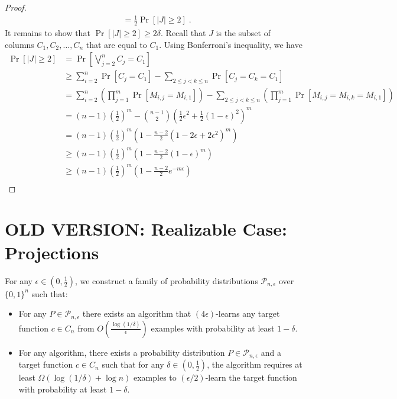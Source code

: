 \documentclass[12pt]{article}
\renewcommand{\P}{\mathcal{P}}
\begin{document}
\begin{proof}
\begin{align*}
& = \frac{1}{2} \Pr \left[ |J| \ge 2 \right] \; .
\end{align*}
It remains to show that $\Pr \left[ |J| \ge 2 \right] \ge 2 \delta$.
Recall that $J$ is the subset of columns $C_1, C_2, \dots, C_n$ that are equal to $C_1$.
Using Bonferroni's inequality, we have
\begin{align*}
\Pr\left[ |J| \ge 2 \right]
& = \Pr\left[ \bigvee_{j=2}^n C_j = C_1 \right] \\
& \ge \sum_{i=2}^n \Pr\left[ C_j = C_1 \right] - \sum_{2 \le  j < k \le n} \Pr\left[ C_j = C_k = C_1 \right] \\
& = \sum_{i=2}^n \left( \prod_{j=1}^m \Pr\left[ M_{i,j} = M_{i,1} \right] \right) - \sum_{2 \le j < k \le n} \left( \prod_{j=1}^m \Pr\left[ M_{i,j} = M_{i,k} = M_{i,1} \right] \right) \\
& = (n-1) \left( \frac{1}{2} \right)^m - \binom{n-1}{2} \left( \frac{1}{2} \epsilon^2 + \frac{1}{2} (1-\epsilon)^2 \right)^m \\
& = (n-1) \left( \frac{1}{2} \right)^m \left(1 - \frac{n-2}{2}(1 - 2\epsilon + 2\epsilon^2)^m \right) \\
& \ge (n-1) \left( \frac{1}{2} \right)^m \left(1 - \frac{n-2}{2}(1 - \epsilon)^m \right) \\
& \ge (n-1) \left( \frac{1}{2} \right)^m \left(1 - \frac{n-2}{2} e^{-m\epsilon} \right) \\
\end{align*}
\end{proof}



\section{OLD VERSION: Realizable Case: Projections}

For any $\epsilon \in (0,\frac{1}{2})$,
we construct a family of probability distributions $\P_{n,\epsilon}$ over $\{0,1\}^n$ such that:
\begin{itemize}
\item For any $P \in \P_{n,\epsilon}$ there exists an algorithm that $(4\epsilon)$-learns
any target function $c \in C_n$ from $O \left( \frac{\log(1/\delta)}{\epsilon} \right)$ examples
with probability at least $1-\delta$.
\item For any algorithm, there exists
a probability distribution $P \in \P_{n,\epsilon}$ and a target function $c \in C_n$
such that for any $\delta \in (0,\frac{1}{2})$, the algorithm requires
at least $\Omega(\log(1/\delta) + \log n)$ examples to $(\epsilon/2)$-learn
the target function with probability at least $1-\delta$.
\end{itemize}
\end{document}

